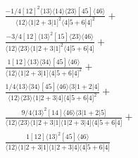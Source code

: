 \documentclass[varwidth, border=5pt]{standalone}
\begin{document}
\begin{my}
$\begin{gathered}
\scriptscriptstyle\frac{-1/4[12]^2⟨13⟩⟨14⟩⟨23⟩[45]⟨46⟩}{⟨12⟩⟨1|2+3|1]^2⟨4|5+6|4]^2}+\\
\scriptscriptstyle\frac{-3/4[12]⟨13⟩^2[15]⟨23⟩⟨46⟩}{⟨12⟩⟨23⟩⟨1|2+3|1]^2⟨4|5+6|4]}+\\
\scriptscriptstyle\frac{1[12]⟨13⟩⟨34⟩[45]⟨46⟩}{⟨12⟩⟨1|2+3|1]⟨4|5+6|4]^2}+\\
\scriptscriptstyle\frac{1/4⟨13⟩⟨34⟩[45]⟨46⟩⟨3|1+2|4]}{⟨12⟩⟨23⟩⟨1|2+3|4]⟨4|5+6|4]^2}+\\
\scriptscriptstyle\frac{9/4⟨13⟩^2[14]⟨46⟩⟨3|1+2|5]}{⟨12⟩⟨23⟩⟨1|2+3|1]⟨1|2+3|4]⟨4|5+6|4]}+\\
\scriptscriptstyle\frac{1[12]⟨13⟩^2[45]⟨46⟩}{⟨12⟩⟨1|2+3|1]⟨1|2+3|4]⟨4|5+6|4]}\phantom{+}
\end{gathered}$
\end{my}
\end{document}
